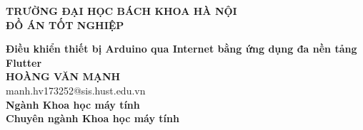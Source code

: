 \documentclass[DoAn.tex]{subfiles}
\begin{document}
\begin{titlepage}
\thispagestyle{empty}
\begin{center}

{\textbf{\large{TRƯỜNG ĐẠI HỌC BÁCH KHOA HÀ NỘI}}}\\[4cm]

{\textbf{\huge{ ĐỒ ÁN TỐT NGHIỆP}}}\\[1cm]
{\textbf{\Large{Điều khiển thiết bị Arduino qua Internet bằng ứng dụng đa nền tảng Flutter}}\\[1cm]

{\textbf{\large{HOÀNG VĂN MẠNH}}}\\
{\large{manh.hv173252@sis.hust.edu.vn}}\\[0.5cm]

{\textbf{\large{Ngành Khoa học máy tính}}}\\
{\textbf{\large{Chuyên ngành Khoa học máy tính}}}\\

\vspace{2cm}
\begin{table}[H]
\centering
{}
\end{table}}
\end{center}



\end{titlepage}
\end{document}

